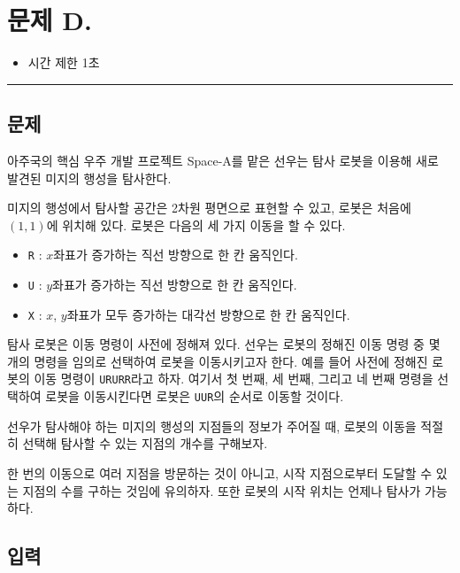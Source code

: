 \newpage
\section*{{\Large 문제 D.} }

\begin{itemize}
    \item 시간 제한 \tabto{2cm} 1초
\end{itemize}

\hrule

\subsection*{문제}

아주국의 핵심 우주 개발 프로젝트 Space-A를 맡은 선우는 탐사 로봇을 이용해 새로 발견된 미지의 행성을 탐사한다.

미지의 행성에서 탐사할 공간은 2차원 평면으로 표현할 수 있고, 로봇은 처음에 $(1, 1)$에 위치해 있다. 로봇은 다음의 세 가지 이동을 할 수 있다.

\begin{itemize}
    \item \texttt{\color{red}R} : $x$좌표가 증가하는 직선 방향으로 한 칸 움직인다.
    \item \texttt{\color{red}U} : $y$좌표가 증가하는 직선 방향으로 한 칸 움직인다.
    \item \texttt{\color{red}X} : $x$, $y$좌표가 모두 증가하는 대각선 방향으로 한 칸 움직인다.
\end{itemize}

탐사 로봇은 이동 명령이 사전에 정해져 있다. 선우는 로봇의 정해진 이동 명령 중 몇 개의 명령을 임의로 선택하여 로봇을 이동시키고자 한다. 예를 들어 사전에 정해진 로봇의 이동 명령이 \texttt{\color{red}URURR}라고 하자. 여기서 첫 번째, 세 번째, 그리고 네 번째 명령을 선택하여 로봇을 이동시킨다면 로봇은 \texttt{\color{red}UUR}의 순서로 이동할 것이다.

선우가 탐사해야 하는 미지의 행성의 지점들의 정보가 주어질 때, 로봇의 이동을 적절히 선택해 탐사할 수 있는 지점의 개수를 구해보자.

한 번의 이동으로 여러 지점을 방문하는 것이 아니고, 시작 지점으로부터 도달할 수 있는 지점의 수를 구하는 것임에 유의하자. 또한 로봇의 시작 위치는 언제나 탐사가 가능하다.

\subsection*{입력}

